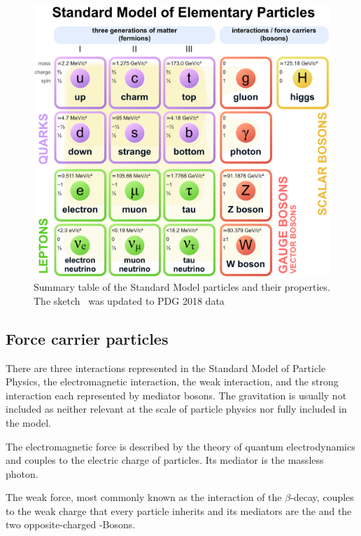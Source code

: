 \begin{figure}
	\centering
	\includegraphics[width=\textwidth]{figures_SM/standard_model.eps}
	\caption[Standard Model particles]{Summary table of the Standard Model particles and their properties. The sketch~\cite{standard_model} was updated to PDG 2018 data~\cite{PDG}}
	\label{fig:sm}
\end{figure}



\subsection{Force carrier particles}

There are three interactions represented in the Standard Model of Particle Physics, the electromagnetic interaction, the weak interaction, and the strong interaction each represented by mediator bosons. The gravitation is usually not included as neither relevant at the scale of particle physics nor fully included in the model.

The electromagnetic force is described by the theory of quantum electrodynamics and couples to the electric charge of particles. Its mediator is the massless photon.

The weak force, most commonly known as the interaction of the $\beta$-decay, couples to the weak charge that every particle inherits and its mediators are the \PZ and the two opposite-charged \PW-Bosons.

